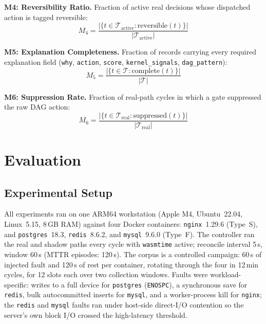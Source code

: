 \documentclass[conference]{IEEEtran}
\begin{document}
\textbf{M4: Reversibility Ratio.} Fraction of active real decisions whose dispatched action is tagged reversible:
\begin{equation}
M_4 = \frac{|\{t \in \mathcal{T}_{\mathrm{active}} : \mathrm{reversible}(t)\}|}{|\mathcal{T}_{\mathrm{active}}|}
\label{eq:M4}
\end{equation}

\textbf{M5: Explanation Completeness.} Fraction of records carrying every required explanation field (\texttt{why}, \texttt{action}, \texttt{score}, \texttt{kernel\_signals}, \texttt{dag\_pattern}):
\begin{equation}
M_5 = \frac{|\{t \in \mathcal{T} : \mathrm{complete}(t)\}|}{|\mathcal{T}|}
\label{eq:M5}
\end{equation}

\textbf{M6: Suppression Rate.} Fraction of real-path cycles in which a gate suppressed the raw DAG action:
\begin{equation}
M_6 = \frac{|\{t \in \mathcal{T}_{\mathrm{real}} : \mathrm{suppressed}(t)\}|}{|\mathcal{T}_{\mathrm{real}}|}
\label{eq:M6}
\end{equation}



\section{Evaluation}
\label{sec:eval}

\subsection{Experimental Setup}

All experiments ran on one ARM64 workstation (Apple M4, Ubuntu~22.04, Linux~5.15, 8\,GB RAM) against four Docker containers: \texttt{nginx}~1.29.6 (Type~S), and \texttt{postgres}~18.3, \texttt{redis}~8.6.2, and \texttt{mysql}~9.6.0 (Type~F). The controller ran the real and shadow paths every cycle with \texttt{wasmtime} active; reconcile interval 5\,s, window 60\,s (MTTR episodes: 120\,s). The corpus is a controlled campaign: 60\,s of injected fault and 120\,s of rest per container, rotating through the four in 12\,min cycles, for 12 slots each over two collection windows. Faults were workload-specific: writes to a full device for \texttt{postgres} (\texttt{ENOSPC}), a synchronous save for \texttt{redis}, bulk autocommitted inserts for \texttt{mysql}, and a worker-process kill for \texttt{nginx}; the \texttt{redis} and \texttt{mysql} faults ran under host-side direct-I/O contention so the server's own block I/O crossed the high-latency threshold.
\end{document}
